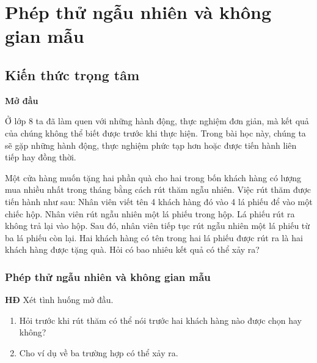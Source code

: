 
\section{Phép thử ngẫu nhiên và không gian mẫu}

\begin{lesson}
    \subsection{Kiến thức trọng tâm}

    \textbf{Mở đầu}

    Ở lớp 8 ta đã làm quen với những hành động, thực nghiệm đơn giản, mà kết quả của chúng không thể biết được trước khi thực hiện. Trong bài học này, chúng ta sẽ gặp những hành động, thực nghiệm phức tạp hơn hoặc được tiến hành liên tiếp hay đồng thời.

    Một cửa hàng muốn tặng hai phần quà cho hai trong bốn khách hàng có lượng mua nhiều nhất trong tháng bằng cách rút thăm ngẫu nhiên. Việc rút thăm được tiến hành như sau: Nhân viên viết tên 4 khách hàng đó vào 4 lá phiếu để vào một chiếc hộp. Nhân viên rút ngẫu nhiên một lá phiếu trong hộp. Lá phiếu rút ra không trả lại vào hộp. Sau đó, nhân viên tiếp tục rút ngẫu nhiên một lá phiếu từ ba lá phiếu còn lại. Hai khách hàng có tên trong hai lá phiếu được rút ra là hai khách hàng được tặng quà. Hỏi có bao nhiêu kết quả có thể xảy ra?

    \answerline

    \subsubsection{Phép thử ngẫu nhiên và không gian mẫu}

    \textbf{HĐ} Xét tình huống mở đầu.
    \begin{enumerate}[label=\alph*)]
        \item Hỏi trước khi rút thăm có thể nói trước hai khách hàng nào được chọn hay không?
        \item Cho ví dụ về ba trường hợp có thể xảy ra.
    \end{enumerate}


\end{lesson}
